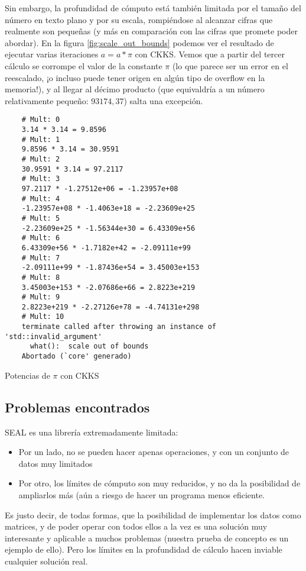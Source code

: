 Sin embargo, la profundidad de cómputo está también limitada por el tamaño del número en texto plano y por su escala, rompiéndose al alcanzar cifras que realmente son pequeñas (y más en comparación con las cifras que promete poder abordar). En la figura \ref{fig:scale_out_bounds} podemos ver el resultado de ejecutar varias iteraciones $a = a*\pi$ con CKKS. Vemos que a partir del tercer cálculo se corrompe el valor de la constante $\pi$ (lo que parece ser un error en el reescalado, ¡o incluso puede tener origen en algún tipo de overflow en la memoria!), y al llegar al décimo producto (que equivaldría a un número relativamente pequeño: $93174,37$) salta una excepción.

\begin{listing}
    \begin{verbatim}
    # Mult: 0
    3.14 * 3.14 = 9.8596
    # Mult: 1
    9.8596 * 3.14 = 30.9591
    # Mult: 2
    30.9591 * 3.14 = 97.2117
    # Mult: 3
    97.2117 * -1.27512e+06 = -1.23957e+08
    # Mult: 4
    -1.23957e+08 * -1.4063e+18 = -2.23609e+25
    # Mult: 5
    -2.23609e+25 * -1.56344e+30 = 6.43309e+56
    # Mult: 6
    6.43309e+56 * -1.7182e+42 = -2.09111e+99
    # Mult: 7
    -2.09111e+99 * -1.87436e+54 = 3.45003e+153
    # Mult: 8
    3.45003e+153 * -2.07686e+66 = 2.8223e+219
    # Mult: 9
    2.8223e+219 * -2.27126e+78 = -4.74131e+298
    # Mult: 10
    terminate called after throwing an instance of 'std::invalid_argument'
      what():  scale out of bounds
    Abortado (`core' generado)
    \end{verbatim}
    \caption{Potencias de $\pi$ con CKKS}
    \label{fig:scale_out_bounds}
\end{listing}

\subsection{Problemas encontrados}

SEAL es una librería extremadamente limitada: 

\begin{itemize}
    \item Por un lado, no se pueden hacer apenas operaciones, y con un conjunto de datos muy limitados
    \item Por otro, los límites de cómputo son muy reducidos, y no da la posibilidad de ampliarlos más (aún a riesgo de hacer un programa menos eficiente.
\end{itemize}

Es justo decir, de todas formas, que la posibilidad de implementar los datos como matrices, y de poder operar con todos ellos a la vez es una solución muy interesante y aplicable a muchos problemas (nuestra prueba de concepto es un ejemplo de ello). Pero los límites en la profundidad de cálculo hacen inviable cualquier solución real.


